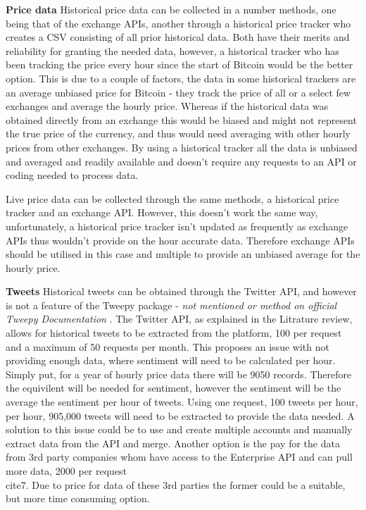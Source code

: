 \documentclass[oneside, 10pt]{article}
\begin{document}
		\textbf{Price data}
		\newline
		\newline
		Historical price data can be collected in a number methods, one being that of the exchange APIs, another through a historical price tracker who creates a CSV consisting of all prior historical data. Both have their merits and reliability for granting the needed data, however, a historical tracker who has been tracking the price every hour since the start of Bitcoin would be the better option. This is due to a couple of factors, the data in some historical trackers are an average unbiased price for Bitcoin - they track the price of all or a select few exchanges and average the hourly price. Whereas if the historical data was obtained directly from an exchange this would be biased and might not represent the true price of the currency, and thus would need averaging with other hourly prices from other exchanges. By using a historical tracker all the data is unbiased and averaged and readily available and doesn't require any requests to an API or coding needed to process data.
		
		Live price data can be collected through the same methods, a historical price tracker and an exchange API. However, this doesn't work the same way, unfortunately, a historical price tracker isn't updated as frequently as exchange APIs thus wouldn't provide on the hour accurate data. Therefore exchange APIs should be utilised in this case and multiple to provide an unbiased average for the hourly price.
		\newline
		
		\textbf{Tweets}
		\newline
		\newline
		Historical tweets can be obtained through the Twitter API, and however is not a feature of the Tweepy package - \textit{not mentioned or method on official Tweepy Documentation} \cite{33}. The Twitter API, as explained in the Litrature review, allows for historical tweets to be extracted from the platform, 100 per request and a maximum of 50 requests per month. This proposes an issue with not providing enough data, where sentiment will need to be calculated per hour. Simply put, for a year of hourly price data there will be 9050 records. Therefore the equivilent will be needed for sentiment, however the sentiment will be the average the sentiment per hour of tweets. Using one request, 100 tweets per hour, per hour, 905,000 tweets will need to be extracted to provide the data needed. A solution to this issue could be to use and create multiple accounts and manually extract data from the API and merge. Another option is the pay for the data from 3rd party companies whom have access to the Enterprise API and can pull more data, 2000 per request \\cite{7}\cite{8}. Due to price for data of these 3rd parties the former could be a suitable, but more time consuming option.
		
\end{document}
